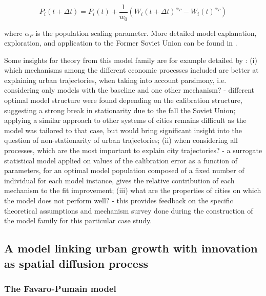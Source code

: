 \documentclass[10pt,letterpaper]{article}
\begin{document}
\begin{equation}
	P_i (t+\Delta t) = P_i (t) + \frac{1}{w_0} \left( W_i (t+\Delta t)^{\alpha_P} - W_i (t)^{\alpha_P} \right)	
\end{equation}

where $\alpha_P$ is the population scaling parameter. More detailed model explanation, exploration, and application to the Former Soviet Union can be found in \citep{cottineau2014evolution,cottineau2015growing,cottineau2015modular}.


Some insights for theory from this model family are for example detailed by \citep{cottineau2015modular}: (i) which mechanisms among the different economic processes included are better at explaining urban trajectories, when taking into account parsimony, i.e. considering only models with the baseline and one other mechanism? - different optimal model structure were found depending on the calibration structure, suggesting a strong break in stationarity due to the fall the Soviet Union; applying a similar approach to other systems of cities remains difficult as the model was tailored to that case, but would bring significant insight into the question of non-stationarity of urban trajectories; (ii) when considering all processes, which are the most important to explain city trajectories? - a surrogate statistical model applied on values of the calibration error as a function of parameters, for an optimal model population composed of a fixed number of individual for each model instance, gives the relative contribution of each mechanism to the fit improvement; (iii) what are the properties of cities on which the model does not perform well? - this provides feedback on the specific theoretical assumptions and mechanism survey done during the construction of the model family for this particular case study.


\subsection{A model linking urban growth with innovation as spatial diffusion process}

\subsubsection{The Favaro-Pumain model}
\end{document}
